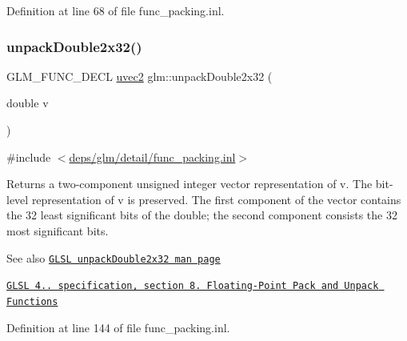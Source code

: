 Definition at line 68 of file func\+\_\+packing.\+inl.

\mbox{\label{group__core__func__packing_ga5f4296dc5f12f0aa67ac05b8bb322483}} 
\subsubsection{\texorpdfstring{unpack\+Double2x32()}{unpackDouble2x32()}}
{\footnotesize\ttfamily G\+L\+M\+\_\+\+F\+U\+N\+C\+\_\+\+D\+E\+CL \hyperlink{group__core__types_gafd2041b45eff671aa8899d2c2835eee9}{uvec2} glm\+::unpack\+Double2x32 (\begin{DoxyParamCaption}\item[{double}]{v }\end{DoxyParamCaption})}



{\ttfamily \#include $<$\hyperlink{func__packing_8inl}{deps/glm/detail/func\+\_\+packing.\+inl}$>$}

Returns a two-\/component unsigned integer vector representation of v. The bit-\/level representation of v is preserved. The first component of the vector contains the 32 least significant bits of the double; the second component consists the 32 most significant bits.

\begin{DoxySeeAlso}{See also}
\href{http://www.opengl.org/sdk/docs/manglsl/xhtml/unpackDouble2x32.xml}{\tt G\+L\+SL unpack\+Double2x32 man page} 

\href{http://www.opengl.org/registry/doc/GLSLangSpec.4.20.8.pdf}{\tt G\+L\+SL 4.. specification, section 8. Floating-\/\+Point Pack and Unpack Functions} 
\end{DoxySeeAlso}


Definition at line 144 of file func\+\_\+packing.\+inl.

\mbox{\label{group__core__func__packing_gaf59b52e6b28da9335322c4ae19b5d745}} 
